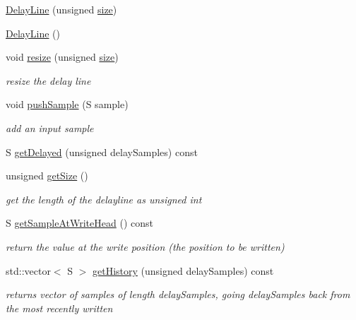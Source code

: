\begin{DoxyCompactItemize}
\item 
\mbox{\hyperlink{classDelayLine_a73b757b74c011b83782dce44d158edaa}{Delay\+Line}} (unsigned \mbox{\hyperlink{classDelayLine_a20216bac2dde1fe037208ecb718577a7}{size}})
\item 
\mbox{\hyperlink{classDelayLine_a43166713f7f497f831d95f348e165f02}{Delay\+Line}} ()
\item 
void \mbox{\hyperlink{classDelayLine_a5b5b9db23797e25f0467917447891d8a}{resize}} (unsigned \mbox{\hyperlink{classDelayLine_a20216bac2dde1fe037208ecb718577a7}{size}})
\begin{DoxyCompactList}\small\item\em resize the delay line \end{DoxyCompactList}\item 
void \mbox{\hyperlink{classDelayLine_a1d549e8fada018b51a66c88e3f1d6ec8}{push\+Sample}} (S sample)
\begin{DoxyCompactList}\small\item\em add an input sample \end{DoxyCompactList}\item 
S \mbox{\hyperlink{classDelayLine_ab738e97677b4227684467e1fa65161bd}{get\+Delayed}} (unsigned delay\+Samples) const
\item 
unsigned \mbox{\hyperlink{classDelayLine_a974138765f721f1978fe3fbb914f9184}{get\+Size}} ()
\begin{DoxyCompactList}\small\item\em get the length of the delayline as unsigned int \end{DoxyCompactList}\item 
S \mbox{\hyperlink{classDelayLine_a21e079073490f2795e6b46d147a3153a}{get\+Sample\+At\+Write\+Head}} () const
\begin{DoxyCompactList}\small\item\em return the value at the write position (the position to be written) \end{DoxyCompactList}\item 
std\+::vector$<$ S $>$ \mbox{\hyperlink{classDelayLine_a35899bf190fe2684f3879645e758db78}{get\+History}} (unsigned delay\+Samples) const
\begin{DoxyCompactList}\small\item\em returns vector of samples of length delay\+Samples, going delay\+Samples back from the most recently written \end{DoxyCompactList}\item 

\end{DoxyCompactItemize}
